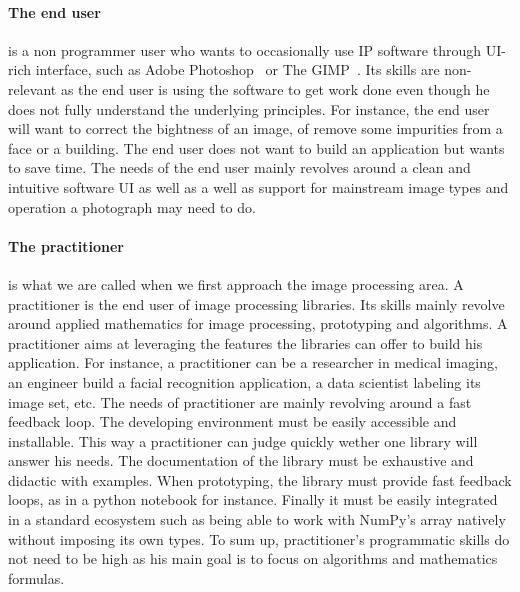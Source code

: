 \paragraph{The end user} is a non programmer user who wants to occasionally use IP software through UI-rich interface,
such as Adobe Photoshop~\parencite{adobe.2019.photoshop} or The GIMP~\parencite{gimp.2019}. Its skills are non-relevant
as the end user is using the software to get work done even though he does not fully understand the underlying
principles. For instance, the end user will want to correct the bightness of an image, of remove some impurities from a
face or a building. The end user does not want to build an application but wants to save time. The needs of the end user
mainly revolves around a clean and intuitive software UI as well as a well as support for mainstream image types and
operation a photograph may need to do.

\paragraph{The practitioner} is what we are called when we first approach the image processing area. A practitioner is
the end user of image processing libraries. Its skills mainly revolve around applied mathematics for image processing,
prototyping and algorithms. A practitioner aims at leveraging the features the libraries can offer to build his
application. For instance, a practitioner can be a researcher in medical imaging, an engineer build a facial recognition
application, a data scientist labeling its image set, etc. The needs of practitioner are mainly revolving around a fast
feedback loop. The developing environment must be easily accessible and installable. This way a practitioner can judge
quickly wether one library will answer his needs. The documentation of the library must be exhaustive and didactic with
examples. When prototyping, the library must provide fast feedback loops, as in a python notebook for instance. Finally
it must be easily integrated in a standard ecosystem such as being able to work with NumPy's array natively without
imposing its own types. To sum up, practitioner's programmatic skills do not need to be high as his main goal is to
focus on algorithms and mathematics formulas.

